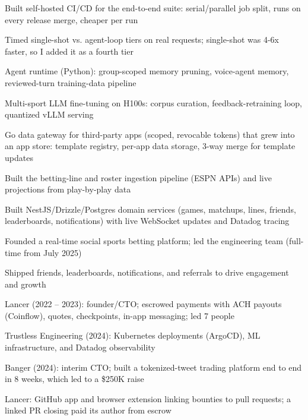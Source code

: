 \documentclass[print]{jack-resume}
\begin{document}
\begin{tightemize}
    \item Built self-hosted CI/CD for the end-to-end suite: serial/parallel job split, runs on every release merge, cheaper per run
    \item Timed single-shot vs. agent-loop tiers on real requests; single-shot was 4-6x faster, so I added it as a fourth tier
    \item Agent runtime (Python): group-scoped memory pruning, voice-agent memory, reviewed-turn training-data pipeline
    \item Multi-sport LLM fine-tuning on H100s: corpus curation, feedback-retraining loop, quantized vLLM serving
    \item Go data gateway for third-party apps (scoped, revocable tokens) that grew into an app store: template registry, per-app data storage, 3-way merge for template updates
\end{tightemize}
\sectionsep

\begin{tightemize}
    \item Built the betting-line and roster ingestion pipeline (ESPN APIs) and live projections from play-by-play data
    \item Built NestJS/Drizzle/Postgres domain services (games, matchups, lines, friends, leaderboards, notifications) with live WebSocket updates and Datadog tracing
    \item Founded a real-time social sports betting platform; led the engineering team (full-time from July 2025)
    \item Shipped friends, leaderboards, notifications, and referrals to drive engagement and growth
\end{tightemize}
\sectionsep

\begin{tightemize}
    \item Lancer (2022 -- 2023): founder/CTO; escrowed payments with ACH payouts (Coinflow), quotes, checkpoints, in-app messaging; led 7 people
    \item Trustless Engineering (2024): Kubernetes deployments (ArgoCD), ML infrastructure, and Datadog observability
    \item Banger (2024): interim CTO; built a tokenized-tweet trading platform end to end in 8 weeks, which led to a \$250K raise
    \item Lancer: GitHub app and browser extension linking bounties to pull requests; a linked PR closing paid its author from escrow
\end{tightemize}
\sectionsep
\end{document}
